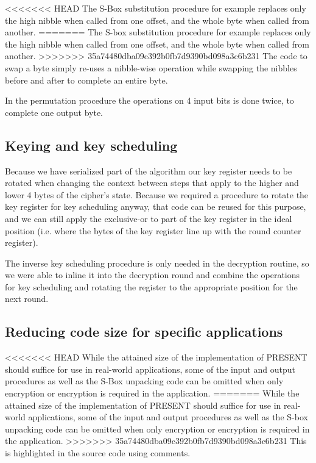 \documentclass[11pt]{article}
\begin{document}
<<<<<<< HEAD
The S-Box substitution procedure for example replaces only the high nibble when called from one offset, and the whole byte when called from another.
=======
The S-box substitution procedure for example replaces only the high nibble when called from one offset, and the whole byte when called from another.
>>>>>>> 35a74480dba09c392b0fb7d9390bd098a3c6b231
The code to swap a byte simply re-uses a nibble-wise operation while swapping the nibbles before and after to complete an entire byte.

In the permutation procedure the operations on 4 input bits is done twice, to complete one output byte.

\subsection{Keying and key scheduling}
Because we have serialized part of the algorithm our key register needs to be rotated when changing the context between steps that apply to the higher and lower 4 bytes of the cipher's state.
Because we required a procedure to rotate the key register for key scheduling anyway, that code can be reused for this purpose, and we can still apply the exclusive-or to part of the key register in the ideal position (i.e. where the bytes of the key register line up with the round counter register).

The inverse key scheduling procedure is only needed in the decryption routine, so we were able to inline it into the decryption round and combine the operations for key scheduling and rotating the register to the appropriate position for the next round.

\subsection{Reducing code size for specific applications}
<<<<<<< HEAD
While the attained size of the implementation of PRESENT should suffice for use in real-world applications, some of the input and output procedures as well as the S-Box unpacking code can be omitted when only encryption or encryption is required in the application.
=======
While the attained size of the implementation of PRESENT should suffice for use in real-world applications, some of the input and output procedures as well as the S-box unpacking code can be omitted when only encryption or encryption is required in the application.
>>>>>>> 35a74480dba09c392b0fb7d9390bd098a3c6b231
This is highlighted in the source code using comments.
\end{document}
